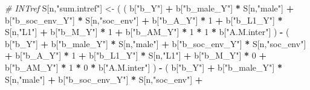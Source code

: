 \documentclass[
]{book}
\newenvironment{Shaded}{\begin{snugshade}}{\end{snugshade}}
\newcommand{\CommentTok}[1]{\textcolor[rgb]{0.56,0.35,0.01}{\textit{#1}}}
\newcommand{\DecValTok}[1]{\textcolor[rgb]{0.00,0.00,0.81}{#1}}
\newcommand{\NormalTok}[1]{#1}
\newcommand{\OtherTok}[1]{\textcolor[rgb]{0.56,0.35,0.01}{#1}}
\newcommand{\SpecialCharTok}[1]{\textcolor[rgb]{0.81,0.36,0.00}{\textbf{#1}}}
\newcommand{\StringTok}[1]{\textcolor[rgb]{0.31,0.60,0.02}{#1}}
\begin{document}
\begin{Shaded}
\begin{Highlighting}[]
    \CommentTok{\# INTref }
\NormalTok{    S[n,}\StringTok{"sum.intref"}\NormalTok{] }\OtherTok{\textless{}{-}}\NormalTok{ ( ( b[}\StringTok{"b\_Y"}\NormalTok{] }\SpecialCharTok{+} 
\NormalTok{                               b[}\StringTok{"b\_male\_Y"}\NormalTok{] }\SpecialCharTok{*}\NormalTok{ S[n,}\StringTok{"male"}\NormalTok{] }\SpecialCharTok{+} 
\NormalTok{                               b[}\StringTok{"b\_soc\_env\_Y"}\NormalTok{] }\SpecialCharTok{*}\NormalTok{ S[n,}\StringTok{"soc\_env"}\NormalTok{] }\SpecialCharTok{+} 
\NormalTok{                               b[}\StringTok{"b\_A\_Y"}\NormalTok{] }\SpecialCharTok{*} \DecValTok{1} \SpecialCharTok{+} 
\NormalTok{                               b[}\StringTok{"b\_L1\_Y"}\NormalTok{] }\SpecialCharTok{*}\NormalTok{ S[n,}\StringTok{"L1"}\NormalTok{] }\SpecialCharTok{+}
\NormalTok{                               b[}\StringTok{"b\_M\_Y"}\NormalTok{] }\SpecialCharTok{*} \DecValTok{1} \SpecialCharTok{+}
\NormalTok{                               b[}\StringTok{"b\_AM\_Y"}\NormalTok{] }\SpecialCharTok{*} \DecValTok{1} \SpecialCharTok{*} \DecValTok{1} \SpecialCharTok{*}\NormalTok{ b[}\StringTok{"A.M.inter"}\NormalTok{] ) }\SpecialCharTok{{-}} 
\NormalTok{                             ( b[}\StringTok{"b\_Y"}\NormalTok{] }\SpecialCharTok{+} 
\NormalTok{                                 b[}\StringTok{"b\_male\_Y"}\NormalTok{] }\SpecialCharTok{*}\NormalTok{ S[n,}\StringTok{"male"}\NormalTok{] }\SpecialCharTok{+} 
\NormalTok{                                 b[}\StringTok{"b\_soc\_env\_Y"}\NormalTok{] }\SpecialCharTok{*}\NormalTok{ S[n,}\StringTok{"soc\_env"}\NormalTok{] }\SpecialCharTok{+} 
\NormalTok{                                 b[}\StringTok{"b\_A\_Y"}\NormalTok{] }\SpecialCharTok{*} \DecValTok{1} \SpecialCharTok{+} 
\NormalTok{                                 b[}\StringTok{"b\_L1\_Y"}\NormalTok{] }\SpecialCharTok{*}\NormalTok{ S[n,}\StringTok{"L1"}\NormalTok{] }\SpecialCharTok{+}
\NormalTok{                                 b[}\StringTok{"b\_M\_Y"}\NormalTok{] }\SpecialCharTok{*} \DecValTok{0} \SpecialCharTok{+}
\NormalTok{                                 b[}\StringTok{"b\_AM\_Y"}\NormalTok{] }\SpecialCharTok{*} \DecValTok{1} \SpecialCharTok{*} \DecValTok{0} \SpecialCharTok{*}\NormalTok{ b[}\StringTok{"A.M.inter"}\NormalTok{] ) }\SpecialCharTok{{-}} 
\NormalTok{                             ( b[}\StringTok{"b\_Y"}\NormalTok{] }\SpecialCharTok{+} 
\NormalTok{                                 b[}\StringTok{"b\_male\_Y"}\NormalTok{] }\SpecialCharTok{*}\NormalTok{ S[n,}\StringTok{"male"}\NormalTok{] }\SpecialCharTok{+} 
\NormalTok{                                 b[}\StringTok{"b\_soc\_env\_Y"}\NormalTok{] }\SpecialCharTok{*}\NormalTok{ S[n,}\StringTok{"soc\_env"}\NormalTok{] }\SpecialCharTok{+} 

\end{Highlighting}
\end{Shaded}
\end{document}
